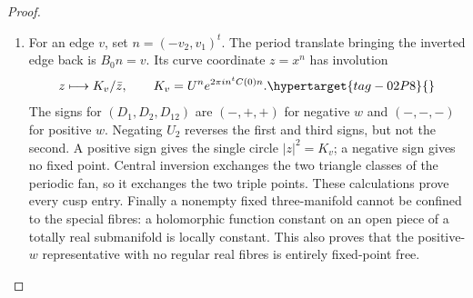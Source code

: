 \begin{proof}
\begin{enumerate}[label=\arabic*.,leftmargin=*]
\item For an edge $v$, set $n=(-v_2,v_1)^t$. The period translate bringing
the inverted edge back is $B_0n=v$. Its curve coordinate $z=x^n$ has
involution
\begin{equation}
 z\longmapsto K_v/\bar z,
 \qquad K_v=U^n e^{2\pi i n^tC(0)n}.
 \hypertarget{tag-02P8}{}\label{mapsI:real-eq-8}
\end{equation}
The signs for $(D_1,D_2,D_{12})$ are $(-,+,+)$ for negative $w$
and $(-,-,-)$ for positive $w$. Negating $U_2$ reverses the first and
third signs, but not the second. A positive sign gives the single
circle $|z|^2=K_v$; a negative sign gives no fixed point. Central
inversion exchanges the two triangle classes of the periodic fan, so
it exchanges the two triple points. These calculations prove every
cusp entry. Finally a nonempty fixed three-manifold cannot be confined
to the special fibres: a holomorphic function constant on an open
piece of a totally real submanifold is locally constant. This also
proves that the positive-$w$ representative with no regular real
fibres is entirely fixed-point free.
\end{enumerate}
\end{proof}
